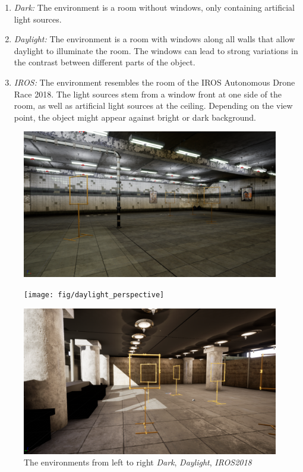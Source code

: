 \begin{enumerate}
	\item \textit{Dark:} The environment is a room without windows, only containing artificial light sources. 
	\item \textit{Daylight:} The environment is a room with windows along all walls that allow daylight to illuminate the room. The windows can lead to strong variations in the contrast between different parts of the object.
	\item \textit{IROS:} The environment resembles the room of the \ac{IROS} Autonomous Drone Race 2018. The light sources stem from a window front at one side of the room, as well as artificial light sources at the ceiling. Depending on the view point, the object might appear against bright or dark background.
\end{enumerate}

\begin{figure}[hbtp]
	\centering
	\begin{minipage}{0.3\textwidth}
		\includegraphics[width=\textwidth]{fig/basement_perspective}
	\end{minipage}
	\begin{minipage}{0.3\textwidth}
		\texttt{[image: fig/daylight\_perspective]}
	\end{minipage}
	\begin{minipage}{0.3\textwidth}
		\includegraphics[width=\textwidth]{fig/iros_perspective}
	\end{minipage}
	\caption{The environments from left to right \textit{Dark}, \textit{Daylight}, \textit{IROS2018}}
	\label{fig:environments}
\end{figure}


